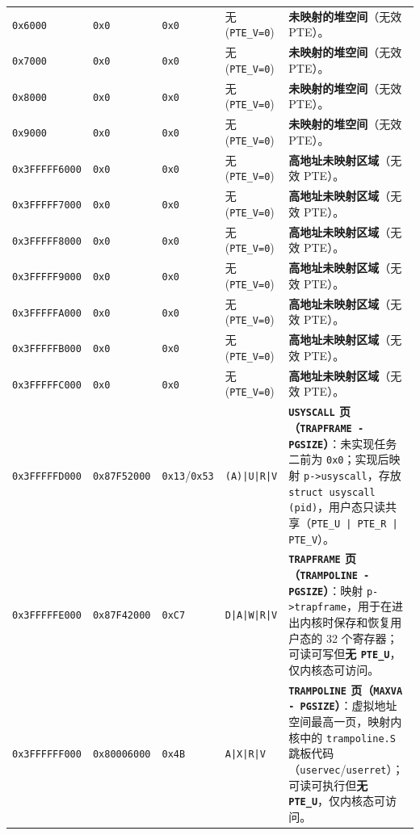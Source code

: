 \documentclass[12pt, a4paper]{ctexart}
\begin{document}
\begin{longtable}{@{}llllp{6.0cm}@{}}
\texttt{0x6000} & \texttt{0x0} & \texttt{0x0} & 无 (\texttt{PTE\_V=0}) & \textbf{未映射的堆空间}（无效 PTE）。 \\
\texttt{0x7000} & \texttt{0x0} & \texttt{0x0} & 无 (\texttt{PTE\_V=0}) & \textbf{未映射的堆空间}（无效 PTE）。 \\
\texttt{0x8000} & \texttt{0x0} & \texttt{0x0} & 无 (\texttt{PTE\_V=0}) & \textbf{未映射的堆空间}（无效 PTE）。 \\
\texttt{0x9000} & \texttt{0x0} & \texttt{0x0} & 无 (\texttt{PTE\_V=0}) & \textbf{未映射的堆空间}（无效 PTE）。 \\
\midrule
\texttt{0x3FFFFF6000} & \texttt{0x0} & \texttt{0x0} & 无 (\texttt{PTE\_V=0}) & \textbf{高地址未映射区域}（无效 PTE）。 \\
\texttt{0x3FFFFF7000} & \texttt{0x0} & \texttt{0x0} & 无 (\texttt{PTE\_V=0}) & \textbf{高地址未映射区域}（无效 PTE）。 \\
\texttt{0x3FFFFF8000} & \texttt{0x0} & \texttt{0x0} & 无 (\texttt{PTE\_V=0}) & \textbf{高地址未映射区域}（无效 PTE）。 \\
\texttt{0x3FFFFF9000} & \texttt{0x0} & \texttt{0x0} & 无 (\texttt{PTE\_V=0}) & \textbf{高地址未映射区域}（无效 PTE）。 \\
\texttt{0x3FFFFFA000} & \texttt{0x0} & \texttt{0x0} & 无 (\texttt{PTE\_V=0}) & \textbf{高地址未映射区域}（无效 PTE）。 \\
\texttt{0x3FFFFFB000} & \texttt{0x0} & \texttt{0x0} & 无 (\texttt{PTE\_V=0}) & \textbf{高地址未映射区域}（无效 PTE）。 \\
\texttt{0x3FFFFFC000} & \texttt{0x0} & \texttt{0x0} & 无 (\texttt{PTE\_V=0}) & \textbf{高地址未映射区域}（无效 PTE）。 \\
\texttt{0x3FFFFFD000} & \texttt{0x87F52000} & \texttt{0x13}/\texttt{0x53} & \texttt{(A)|U|R|V} & \textbf{\texttt{USYSCALL} 页（\texttt{TRAPFRAME - PGSIZE}）}：未实现任务二前为 \texttt{0x0}；实现后映射 \texttt{p->usyscall}，存放 \texttt{struct usyscall (pid)}，用户态只读共享（\texttt{PTE\_U | PTE\_R | PTE\_V}）。 \\
\texttt{0x3FFFFFE000} & \texttt{0x87F42000} & \texttt{0xC7} & \texttt{D|A|W|R|V} & \textbf{\texttt{TRAPFRAME} 页（\texttt{TRAMPOLINE - PGSIZE}）}：映射 \texttt{p->trapframe}，用于在进出内核时保存和恢复用户态的 32 个寄存器；可读可写但\textbf{无 \texttt{PTE\_U}}，仅内核态可访问。 \\
\texttt{0x3FFFFFF000} & \texttt{0x80006000} & \texttt{0x4B} & \texttt{A|X|R|V} & \textbf{\texttt{TRAMPOLINE} 页（\texttt{MAXVA - PGSIZE}）}：虚拟地址空间最高一页，映射内核中的 \texttt{trampoline.S} 跳板代码（\texttt{uservec}/\texttt{userret}）；可读可执行但\textbf{无 \texttt{PTE\_U}}，仅内核态可访问。 \\
\bottomrule
\end{longtable}
\end{document}
